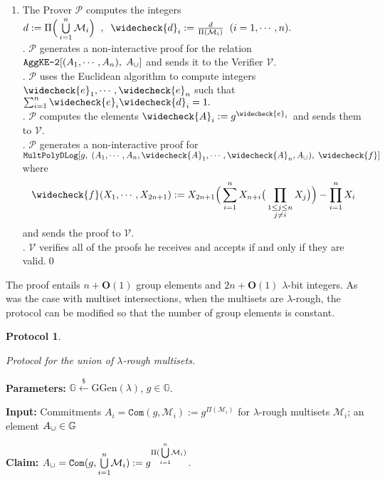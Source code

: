 \documentclass[11pt, lettersize, notitlepage, leqno, footskip=0.6cm]{article}
\newcommand{\pl}{\prod\limits}
\newcommand{\slim}{\sum\limits}
\newcommand{\ttt}{\texttt}
\newcommand{\mc}{\mathcal}
\newcommand{\mb}{\mathbb}
\newcommand{\mbf}{\mathbf}
\newcommand{\mr}{\mathrm}
\newcommand{\lam}{\lambda}
\newcommand{\lamb}{\lambda}
\newcommand{\weck}{\widecheck}
\newcommand{\bO}{\mbf{O}}
\newcommand{\mP}{\mc{P}}
\newcommand{\V}{\mc{V}}
\newcommand{\mcM}{\mc{M}}
\newcommand{\vs}{\vspace{-0.15cm}}
\newcommand{\noin}{\noindent}
\newtheorem{Prot}[Thm]{Protocol}
\numberwithin{equation}{section}
\begin{document}
\begin{enumerate}[wide, labelwidth=!, labelindent=0pt]\vs \item The Prover $\mP$ computes the integers $d:= \Pi\Big(\bigcup\limits_{i=1}^n \mc{M}_i\Big)\;\;,\;\;\weck{d}_i:= \frac{d}{\Pi(\mcM_i)}\;\;(i=1,\cdots,n).$\\
\noin 2. $\mP$ generates a non-interactive proof for the relation $\ttt{AggKE-2}[(A_1,\cdots,A_n),\;A_{\tt{\cup}}]$ and sends it to the Verifier $\V$. \\
\noin 3. $\mP$ uses the Euclidean algorithm to compute integers $\weck{e}_1,\cdots, \weck{e}_n$ such that $\sum_{i=1}^n \weck{e}_i\weck{d}_i = 1.$ \\
\noin 4. $\mP$ computes the elements $\weck{A}_i:= g^{\weck{e}_i}$ and sends them to $\V$.\\
\noin 5. $\mP$ generates a non-interactive proof for $\ttt{MultPolyDLog}[g,\;(A_1,\cdots,A_n,\weck{A}_1,\cdots,\weck{A}_n,A_{\tt{\cup}}),\; \weck{f}]$ where \vs $$\weck{f}(X_1,\cdots,X_{2n+1}):= X_{2n+1}\Big(\slim_{i=1}^n X_{n+i}\big(\pl_{\substack{1\leq j\leq n\\ j\neq i}} X_{j}\big)\Big) - \pl_{i=1}^n X_i\vs $$ and sends the proof to $\V$.\\
\noin 6. $\V$ verifies all of the proofs he receives and accepts if and only if they are valid.\qed \end{enumerate}


\noin The proof entails $n+\bO(1)$ group elements and $2n+\bO(1)$ $\lam$-bit integers. As was the case with multiset intersections, when the multisets are $\lam$-rough, the protocol can be modified so that the number of group elements is constant.

\vspace{0.1cm}

\begin{Prot} \hypertarget{Uni}{Protocol for the union of $\lam$-rough multisets.}\end{Prot} \vspace{-0.3cm}

\noin \textbf{Parameters:} $\mb{G}\xleftarrow{\$} \mr{GGen}(\lamb)$,\; $g\in \mb{G}$.

\noin \textbf{Input:} Commitments $A_i = \ttt{Com}(g, \mc{M}_i) := g^{\Pi(\mc{M}_i)}$ for $\lam$-rough multisets $\mc{M}_i$; an element $A_{\tt{\cup}}\in\mb{G}$

\noin \textbf{Claim:} $A_{\tt{\cup}} = \protect{\verb|Com|}(g, {\bigcup\limits_{i=1}^n} \mc{M}_i) := g^{\Pi({\bigcup\limits_{i=1}^n} \mc{M}_i)}$.
\end{document}
